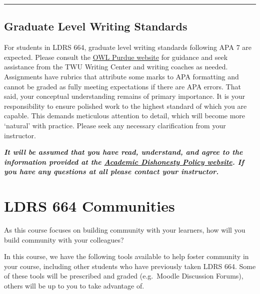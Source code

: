 \documentclass[
]{book}
\begin{document}
\begin{center}\rule{0.5\linewidth}{0.5pt}\end{center}

\hypertarget{graduate-level-writing-standards}{%
\section*{Graduate Level Writing Standards}\label{graduate-level-writing-standards}}

For students in LDRS 664, graduate level writing standards following APA 7 are expected. Please consult the \href{https://owl.purdue.edu/owl/research_and_citation/apa_style/apa_style_introduction.html}{OWL Purdue website} for guidance and seek assistance from the TWU Writing Center and writing coaches as needed. Assignments have rubrics that attribute some marks to APA formatting and cannot be graded as fully meeting expectations if there are APA errors. That said, your conceptual understanding remains of primary importance. It is your responsibility to ensure polished work to the highest standard of which you are capable. This demands meticulous attention to detail, which will become more `natural' with practice. Please seek any necessary clarification from your instructor.

\begin{caution}
\textbf{\emph{It will be assumed that you have read, understand, and
agree to the information provided at the
\href{https://www.twu.ca/student-handbook/university-policies/academic-misconduct/procedures-dealing-acts-academic-0}{Academic
Dishonesty Policy website}. If you have any questions at all please
contact your instructor.}}
\end{caution}

\hypertarget{ldrs-664-communities}{%
\chapter*{LDRS 664 Communities}\label{ldrs-664-communities}}

As this course focuses on building community with your learners, how will you build community with your colleagues?

In this course, we have the following tools available to help foster community in your course, including other students who have previously taken LDRS 664. Some of these tools will be prescribed and graded (e.g.~Moodle Discussion Forums), others will be up to you to take advantage of.
\end{document}
